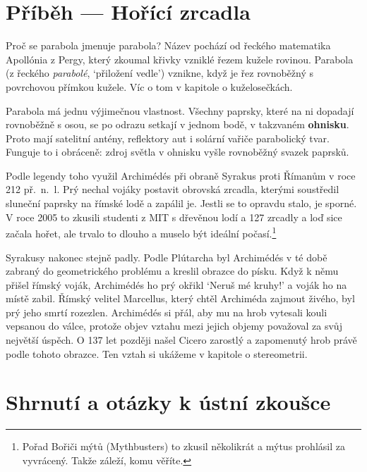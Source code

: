 \section{Příběh --- Hořící zrcadla}

Proč se parabola jmenuje parabola? Název pochází od řeckého matematika Apollónia z Pergy, který zkoumal křivky vzniklé řezem kužele rovinou. Parabola (z řeckého \textit{parabolé}, `přiložení vedle') vznikne, když je řez rovnoběžný s povrchovou přímkou kužele. Víc o tom v kapitole o kuželosečkách.

Parabola má jednu výjimečnou vlastnost. Všechny paprsky, které na ni dopadají rovnoběžně s osou, se po odrazu setkají v jednom bodě, v takzvaném \textbf{ohnisku}. Proto mají satelitní antény, reflektory aut i solární vařiče parabolický tvar. Funguje to i obráceně: zdroj světla v ohnisku vyšle rovnoběžný svazek paprsků.

Podle legendy toho využil Archimédés při obraně Syrakus proti Římanům v roce 212 př.~n.~l. Prý nechal vojáky postavit obrovská zrcadla, kterými soustředil sluneční paprsky na římské lodě a zapálil je. Jestli se to opravdu stalo, je sporné. V roce 2005 to zkusili studenti z MIT s dřevěnou lodí a 127 zrcadly a loď sice začala hořet, ale trvalo to dlouho a muselo být ideální počasí.\footnote{Pořad Bořiči mýtů (Mythbusters) to zkusil několikrát a mýtus prohlásil za vyvrácený. Takže záleží, komu věříte.}

Syrakusy nakonec stejně padly. Podle Plútarcha byl Archimédés v té době zabraný do geometrického problému a kreslil obrazce do písku. Když k němu přišel římský voják, Archimédés ho prý okřikl `Neruš mé kruhy!' a voják ho na místě zabil. Římský velitel Marcellus, který chtěl Archiméda zajmout živého, byl prý jeho smrtí rozezlen. Archimédés si přál, aby mu na hrob vytesali kouli vepsanou do válce, protože objev vztahu mezi jejich objemy považoval za svůj největší úspěch. O 137 let později našel Cicero zarostlý a zapomenutý hrob právě podle tohoto obrazce. Ten vztah si ukážeme v kapitole o stereometrii.

\section{Shrnutí a otázky k ústní zkoušce}

